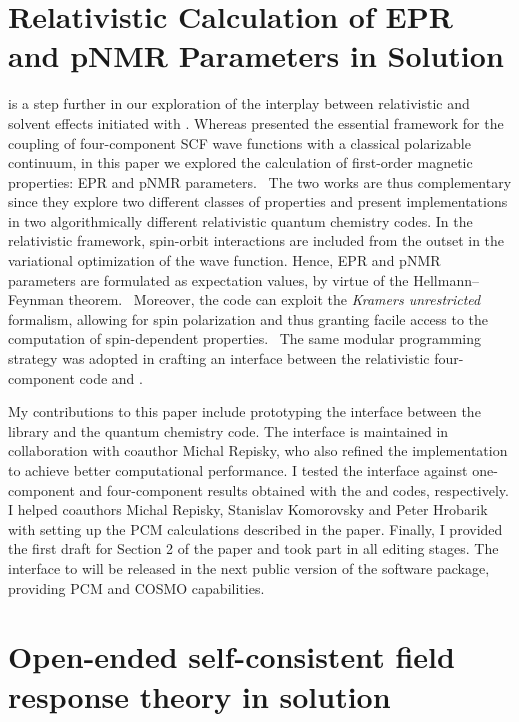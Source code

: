 \section{Relativistic Calculation of EPR and pNMR Parameters in
Solution}\label{sec:pcmepr}

 is a step further in our exploration of the interplay between
relativistic and solvent effects initiated with .
Whereas  presented the essential framework for the coupling of
four-component \acrshort{SCF} wave functions with a classical polarizable continuum,
in this paper we explored the calculation of first-order magnetic properties:
\gls{EPR} and \gls{pNMR} parameters.~\autocite{Repisky2010-ls, Malkin2011-nm,
Komorovsky2013-xa, Cherry2016-ij}
The two works are thus complementary since they explore two different classes
of properties and present implementations in two algorithmically different
relativistic quantum chemistry codes.
In the relativistic framework, spin-orbit interactions are included from the
outset in the variational optimization of the wave function.
Hence, \acrshort{EPR} and \acrshort{pNMR} parameters are formulated as expectation
values, by virtue of the Hellmann--Feynman theorem.~\autocite{Konishi2009-zb,
Helgaker2000-tz}
Moreover, the \ReSpect code can exploit the \emph{Kramers unrestricted} formalism,
allowing for spin polarization and thus granting facile access to the computation
of spin-dependent properties.~\autocite{Dyall2007-tu}
The same modular programming strategy was adopted in crafting an interface between the
relativistic four-component code \ReSpect\autocite{ReSpect-3.5.0} and \pcmsolver.

My contributions to this paper include prototyping the interface between the
\pcmsolver library and the \ReSpect quantum chemistry code.
The interface is maintained in collaboration with coauthor Michal Repisky, who also
refined the implementation to achieve better computational performance.
I tested the interface against one-component and four-component results obtained with
the \LSDALTON and \DIRAC codes, respectively.
I helped coauthors Michal Repisky, Stanislav Komorovsky and Peter Hrobarik
with setting up the \acrshort{PCM} calculations described in the paper.
Finally, I provided the first draft for Section 2 of the paper and took part in all editing stages.
The interface to \ReSpect will be released in the next public version of the software
package, providing \acrshort{PCM} and \acrshort{COSMO} capabilities.

\section{Open-ended self-consistent field response theory in
solution}\label{sec:pcmopenrsp}

